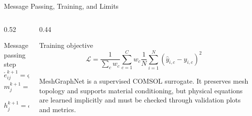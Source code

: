 \begin{frame}{Message Passing, Training, and Limits}
  \begin{columns}[T]
    \begin{column}{0.52\textwidth}
      \begin{block}{Message passing step}
        \[
          \tilde{e}_{ij}^{k+1}=\phi_e^k([h_i^k,h_j^k,e_{ij}^k])
        \]
        \[
          m_j^{k+1}=\sum_{i:(i,j)\in\mathcal{E}}e_{ij}^{k+1}
        \]
        \[
          h_j^{k+1}=\phi_v^k([h_j^k,m_j^{k+1}])
        \]
      \end{block}
    \end{column}
    \begin{column}{0.44\textwidth}
      \begin{block}{Training objective}
        \[
          \mathcal{L}=\frac{1}{\sum_c w_c}\sum_{c=1}^{C}w_c
          \frac{1}{N}\sum_{i=1}^{N}(\hat{y}_{i,c}-y_{i,c})^2
        \]
      \end{block}
      \scriptsize
      MeshGraphNet is a supervised COMSOL surrogate. It preserves mesh topology
      and supports material conditioning, but physical equations are learned
      implicitly and must be checked through validation plots and metrics.
    \end{column}
  \end{columns}
\end{frame}
